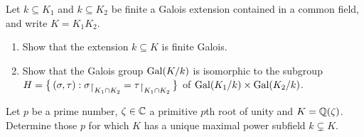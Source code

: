 \begin{problem}
  Let \(k\subseteq K_1\) and \(k\subseteq K_2\) be finite a Galois extension
  contained in a common field, and write \(K=K_1K_2\).
  \begin{enumerate}[label=(\alph*)]
  \item Show that the extension \(k\subseteq K\) is finite Galois.
  \item Show that the Galois group \(\operatorname{Gal}(K/k)\) is isomorphic to the
    subgroup
    \(H=\bigl\{\,(\sigma,\tau):\sigma\restrict{K_1\cap
      K_2}=\tau\restrict{K_1\cap K_2}\,\bigr\}\) of
    \(\operatorname{Gal}(K_1/k)\times\operatorname{Gal}(K_2/k)\).
  \end{enumerate}
\end{problem}
\begin{solution}
\end{solution}

\begin{problem}
  Let \(p\) be a prime number, \(\zeta\in\mathbb{C}\) a primitive \(p\)th root of
  unity and \(K=\mathbb{Q}(\zeta)\). Determine those \(p\) for which \(K\) has a
  unique maximal power subfield \(k\subsetneq K\).
\end{problem}
\begin{solution}
  \begin{quote}
    \large
  \end{quote}
\end{solution}

